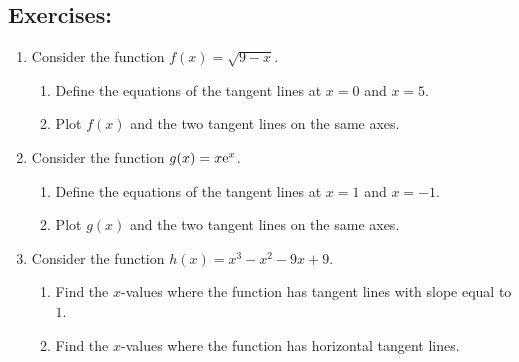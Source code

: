 \subsection*{Exercises:}
\begin{enumerate}
	\item  Consider the function $f(x) = \sqrt{9 - x}$.
    \begin{enumerate} 
    	\item Define the equations of the tangent lines at $x=0$ and $x=5$.
    	
    	\item Plot $f(x)$ and the two tangent lines on the same axes.
    \end{enumerate}
    \item Consider the function $g(x)=x{\rm e}^{x}$.
		\begin{enumerate}
			\item Define the equations of the tangent lines at $x=1$ and $x=-1$.
			\item Plot $g(x)$ and the two tangent lines on the same axes.
		\end{enumerate}
	\item Consider the function $h(x)=x^3-x^2-9x+9$. 
	\begin{enumerate}
		\item Find the $x$-values where the function has tangent lines with slope equal to $1$. 
		\item Find the $x$-values where the function has horizontal tangent lines.
	\end{enumerate}
\end{enumerate}
